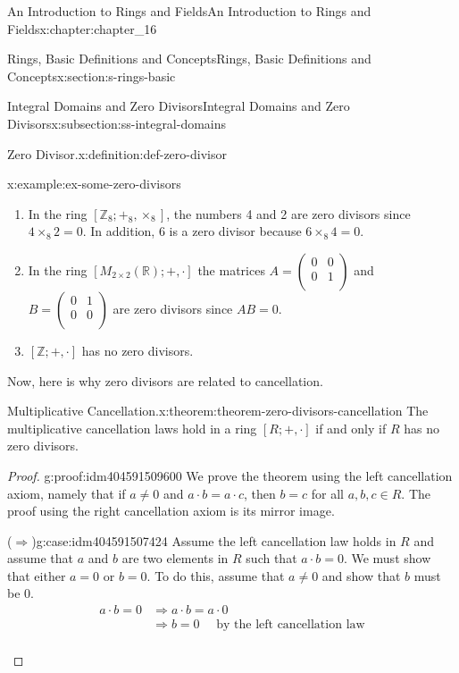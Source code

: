 \documentclass[twoside,10pt,]{book}
\newcommand{\forwardimplication}{($\Rightarrow$)}
\numberwithin{equation}{section}
\begin{document}
\begin{chapterptx}{An Introduction to Rings and Fields}{}{An Introduction to Rings and Fields}{}{}{x:chapter:chapter_16}
\begin{sectionptx}{Rings, Basic Definitions and Concepts}{}{Rings, Basic Definitions and Concepts}{}{}{x:section:s-rings-basic}
\begin{subsectionptx}{Integral Domains and Zero Divisors}{}{Integral Domains and Zero Divisors}{}{}{x:subsection:ss-integral-domains}
\begin{definition}{Zero Divisor.}{x:definition:def-zero-divisor}
\end{definition}
\begin{example}{}{x:example:ex-some-zero-divisors}%
%
\begin{enumerate}[label=(\alph*)]
\item{}In the ring \([\mathbb{Z}_8;+_8,\times_8]\), the numbers 4 and 2 are zero divisors since \(4 \times_8 2 =0\).  In addition, 6 is  a zero divisor because \(6\times_8 4 = 0\).%
\item{}In the ring \(\left[M_{2\times 2}(\mathbb{R}); +, \cdot \right]\) the matrices  \(A=\left(
\begin{array}{cc}
0 & 0 \\
0 & 1 \\
\end{array}
\right)\) and \(B=\left(
\begin{array}{cc}
0 & 1 \\
0 & 0 \\
\end{array}
\right)\) are zero divisors since \(A B = 0\).%
\item{}\([\mathbb{Z}; +, \cdot]\) has no zero divisors.%
\end{enumerate}
%
\end{example}
Now, here is why zero divisors are related to cancellation.%
\begin{theorem}{Multiplicative Cancellation.}{}{x:theorem:theorem-zero-divisors-cancellation}%
The multiplicative cancellation laws hold in a ring \([R; +, \cdot ]\) if and only if \(R\) has no zero divisors.%
\end{theorem}
\begin{proof}{}{g:proof:idm404591509600}
We prove the theorem using the left cancellation axiom, namely that if \(a \neq  0\) and \(a \cdot  b = a \cdot  c\), then \(b = c\) for all \(a, b, c\in R\). The proof using the right cancellation axiom is its mirror image.%
\begin{case}{\forwardimplication}{}{g:case:idm404591507424}
Assume the left cancellation law holds in \(R\) and assume that \(a\) and \(b\) are two elements in \(R\) such that \(a \cdot  b = 0\). We must show that either \(a = 0\) or \(b = 0\). To do this, assume that \(a \neq  0\) and show that \(b\) must be 0.%
\begin{equation*}
\begin{split}
a\cdot b = 0 &\Rightarrow a\cdot b = a\cdot 0\\
& \Rightarrow  b = 0\quad \textrm{ by the left cancellation law}\\

\end{split}
\end{equation*}
\end{case}
\end{proof}
\end{subsectionptx}
\end{sectionptx}
\end{chapterptx}
\end{document}
